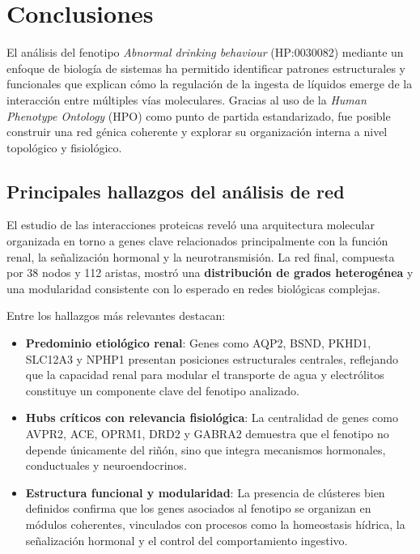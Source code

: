 \section{Conclusiones}

El análisis del fenotipo \textit{Abnormal drinking behaviour} (HP:0030082) mediante un enfoque de biología de sistemas ha permitido identificar patrones estructurales y funcionales que explican cómo la regulación de la ingesta de líquidos emerge de la interacción entre múltiples vías moleculares. Gracias al uso de la \textit{Human Phenotype Ontology} (HPO) como punto de partida estandarizado, fue posible construir una red génica coherente y explorar su organización interna a nivel topológico y fisiológico.

\subsection{Principales hallazgos del análisis de red}
El estudio de las interacciones proteicas reveló una arquitectura molecular organizada en torno a genes clave relacionados principalmente con la función renal, la señalización hormonal y la neurotransmisión. La red final, compuesta por 38 nodos y 112 aristas, mostró una \textbf{distribución de grados heterogénea} y una modularidad consistente con lo esperado en redes biológicas complejas.

Entre los hallazgos más relevantes destacan:
\begin{itemize}
    \item \textbf{Predominio etiológico renal}: Genes como AQP2, BSND, PKHD1, SLC12A3 y NPHP1 presentan posiciones estructurales centrales, reflejando que la capacidad renal para modular el transporte de agua y electrólitos constituye un componente clave del fenotipo analizado.

    \item \textbf{Hubs críticos con relevancia fisiológica}: La centralidad de genes como AVPR2, ACE, OPRM1, DRD2 y GABRA2 demuestra que el fenotipo no depende únicamente del riñón, sino que integra mecanismos hormonales, conductuales y neuroendocrinos.
    
    \item \textbf{Estructura funcional y modularidad}: La presencia de clústeres bien definidos confirma que los genes asociados al fenotipo se organizan en módulos coherentes, vinculados con procesos como la homeostasis hídrica, la señalización hormonal y el control del comportamiento ingestivo.
\end{itemize}

